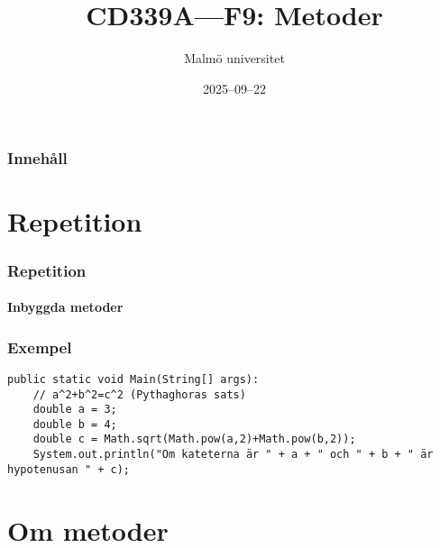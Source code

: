 \documentclass[aspectratio=169]{beamer}
\title{CD339A---F9: Metoder}
\author{Malmö universitet}
\date{2025--09--22}
\institute{Institutionen för datavetenskap och medieteknik}
\begin{document}
\begin{frame}
    \frametitle{Innehåll}

    \begin{multicols}{2}
        \tableofcontents
    \end{multicols}

\end{frame}

\section{Repetition}

\begin{frame}
    \frametitle{Repetition}
    \framesubtitle{Inbyggda metoder}



\end{frame}

\begin{frame}[fragile]
    \frametitle{Exempel}


    \begin{lstlisting}
public static void Main(String[] args):
    // a^2+b^2=c^2 (Pythaghoras sats)
    double a = 3;
    double b = 4;
    double c = Math.sqrt(Math.pow(a,2)+Math.pow(b,2));
    System.out.println("Om kateterna är " + a + " och " + b + " är hypotenusan " + c);
    \end{lstlisting}


\end{frame}

\section{Om metoder}
\end{document}

